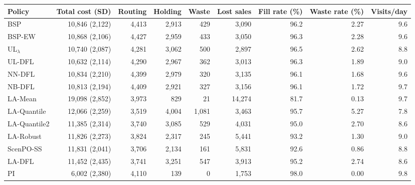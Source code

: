 \begin{tabular}{lrrrrrrrr}
\toprule
Policy & Total cost (SD) & Routing & Holding & Waste & Lost sales & Fill rate (\%) & Waste rate (\%) & Visits/day \\
\midrule
BSP & 10,846 (2,122) & 4,413 & 2,913 & 429 & 3,090 & 96.2 & 2.27 & 9.6 \\
BSP-EW & 10,868 (2,106) & 4,427 & 2,959 & 433 & 3,050 & 96.3 & 2.28 & 9.6 \\
UL$_\lambda$ & 10,740 (2,087) & 4,281 & 3,062 & 500 & 2,897 & 96.5 & 2.62 & 8.8 \\
UL-DFL & 10,632 (2,114) & 4,290 & 2,967 & 362 & 3,013 & 96.3 & 1.89 & 9.0 \\
NN-DFL & 10,834 (2,210) & 4,399 & 2,979 & 320 & 3,135 & 96.1 & 1.68 & 9.6 \\
NB-DFL & 10,813 (2,194) & 4,409 & 2,921 & 327 & 3,156 & 96.1 & 1.72 & 9.7 \\
LA-Mean & 19,098 (2,852) & 3,973 & 829 & 21 & 14,274 & 81.7 & 0.13 & 9.7 \\
LA-Quantile & 12,066 (2,259) & 3,519 & 4,004 & 1,081 & 3,463 & 95.7 & 5.27 & 7.8 \\
LA-Quantile2 & 11,385 (2,314) & 3,740 & 3,085 & 529 & 4,031 & 95.0 & 2.70 & 8.6 \\
LA-Robust & 11,826 (2,273) & 3,824 & 2,317 & 245 & 5,441 & 93.2 & 1.30 & 9.0 \\
ScenPO-SS & 11,831 (2,041) & 3,706 & 2,134 & 161 & 5,831 & 92.6 & 0.86 & 8.8 \\
LA-DFL & 11,452 (2,435) & 3,741 & 3,251 & 547 & 3,913 & 95.2 & 2.74 & 8.6 \\
PI & 6,002 (2,380) & 4,110 & 139 & 0 & 1,753 & 98.0 & 0.00 & 9.8 \\
\bottomrule
\end{tabular}
